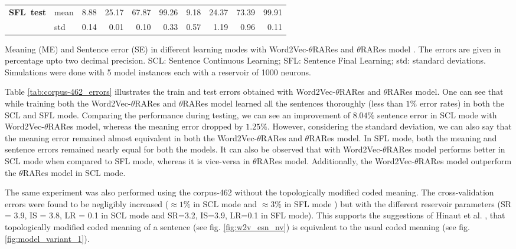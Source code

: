 \begin{table}[htbp]
\begin{threeparttable}
\begin{tabular}{llrrrrrrrr}
  \textbf{SFL\ test}    & mean  & 8.88 & 25.17         & 67.87 & 99.26     & 9.18 & 24.37     & 73.39 & 99.91    \\
                            & std     & 0.14 & 0.01        & 0.10  & 0.33      & 0.57 & 1.19     & 0.96  & 0.11    \\
  \bottomrule
\end{tabular}
\begin{tablenotes}
\small
\item 
Meaning (ME) and Sentence error (SE) in different learning modes with Word2Vec-$\theta$RARes and $\theta$RARes model \cite{xavier:2013:RT}. The errors are given in percentage upto two decimal precision. SCL: Sentence Continuous Learning; SFL: Sentence Final Learning; std: standard deviations. Simulations were done with 5 model instances each with a reservoir of 1000 neurons.
\end{tablenotes}
\end{threeparttable}
\end{table}

Table \ref{tab:corpus-462_errors} illustrates the train and test errors obtained with Word2Vec-$\theta$RARes and $\theta$RARes model. One can see that while training both the Word2Vec-$\theta$RARes and $\theta$RARes model learned all the sentences thoroughly (less than $ 1\% $ error rates) in both the SCL and  SFL mode. Comparing the performance during testing, we can see an improvement of $8.04 \%$ sentence error in SCL mode with Word2Vec-$\theta$RARes model, whereas the meaning error dropped by $1.25 \%$. However, considering the standard deviation, we can also say that the meaning error remained almost equivalent in both the Word2Vec-$\theta$RARes and $\theta$RARes model. In SFL mode, both the meaning and sentence errors remained nearly equal for both the models. It can also be observed that with Word2Vec-$\theta$RARes model performs better in SCL mode when compared to SFL mode, whereas it is vice-versa in $\theta$RARes model. Additionally, the Word2Vec-$\theta$RARes model outperform the $\theta$RARes model in SCL mode.

The same experiment was also performed using the corpus-462 without the topologically modified coded meaning. The cross-validation errors were found to be negligibly increased ($\approx 1 \%$ in SCL mode and $\approx 3 \%$ in SFL mode ) but with the different reservoir parameters (SR = 3.9, IS = 3.8, LR = 0.1 in SCL mode and SR=3.2, IS=3.9, LR=0.1 in SFL mode). This supports the suggestions of Hinaut et al. \cite{xavier:2013:RT}, that topologically modified coded meaning of a sentence (see fig. \ref{fig:w2v_esn_nv}) is equivalent to the usual coded meaning (see fig. \ref{fig:model_variant_1}).

